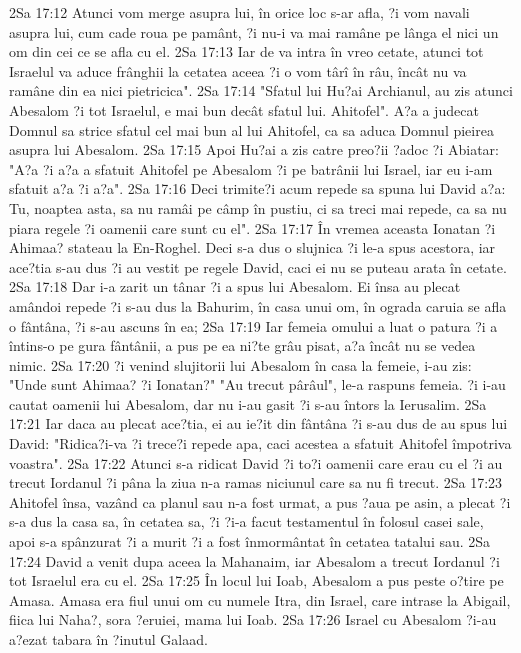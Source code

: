 2Sa 17:12  Atunci vom merge asupra lui, în orice loc s-ar afla, ?i vom navali asupra lui, cum cade roua pe pamânt, ?i nu-i va mai ramâne pe lânga el nici un om din cei ce se afla cu el.
2Sa 17:13  Iar de va intra în vreo cetate, atunci tot Israelul va aduce frânghii la cetatea aceea ?i o vom târî în râu, încât nu va ramâne din ea nici pietricica".
2Sa 17:14  "Sfatul lui Hu?ai Archianul, au zis atunci Abesalom ?i tot Israelul, e mai bun decât sfatul lui. Ahitofel". A?a a judecat Domnul sa strice sfatul cel mai bun al lui Ahitofel, ca sa aduca Domnul pieirea asupra lui Abesalom.
2Sa 17:15  Apoi Hu?ai a zis catre preo?ii ?adoc ?i Abiatar: "A?a ?i a?a a sfatuit Ahitofel pe Abesalom ?i pe batrânii lui Israel, iar eu i-am sfatuit a?a ?i a?a".
2Sa 17:16  Deci trimite?i acum repede sa spuna lui David a?a: Tu, noaptea asta, sa nu ramâi pe câmp în pustiu, ci sa treci mai repede, ca sa nu piara regele ?i oamenii care sunt cu el".
2Sa 17:17  În vremea aceasta Ionatan ?i Ahimaa? stateau la En-Roghel. Deci s-a dus o slujnica ?i le-a spus acestora, iar ace?tia s-au dus ?i au vestit pe regele David, caci ei nu se puteau arata în cetate.
2Sa 17:18  Dar i-a zarit un tânar ?i a spus lui Abesalom. Ei însa au plecat amândoi repede ?i s-au dus la Bahurim, în casa unui om, în ograda caruia se afla o fântâna, ?i s-au ascuns în ea;
2Sa 17:19  Iar femeia omului a luat o patura ?i a întins-o pe gura fântânii, a pus pe ea ni?te grâu pisat, a?a încât nu se vedea nimic.
2Sa 17:20  ?i venind slujitorii lui Abesalom în casa la femeie, i-au zis: "Unde sunt Ahimaa? ?i Ionatan?" "Au trecut pârâul", le-a raspuns femeia. ?i i-au cautat oamenii lui Abesalom, dar nu i-au gasit ?i s-au întors la Ierusalim.
2Sa 17:21  Iar daca au plecat ace?tia, ei au ie?it din fântâna ?i s-au dus de au spus lui David: "Ridica?i-va ?i trece?i repede apa, caci acestea a sfatuit Ahitofel împotriva voastra".
2Sa 17:22  Atunci s-a ridicat David ?i to?i oamenii care erau cu el ?i au trecut Iordanul ?i pâna la ziua n-a ramas niciunul care sa nu fi trecut.
2Sa 17:23  Ahitofel însa, vazând ca planul sau n-a fost urmat, a pus ?aua pe asin, a plecat ?i s-a dus la casa sa, în cetatea sa, ?i ?i-a facut testamentul în folosul casei sale, apoi s-a spânzurat ?i a murit ?i a fost înmormântat în cetatea tatalui sau.
2Sa 17:24  David a venit dupa aceea la Mahanaim, iar Abesalom a trecut Iordanul ?i tot Israelul era cu el.
2Sa 17:25  În locul lui Ioab, Abesalom a pus peste o?tire pe Amasa. Amasa era fiul unui om cu numele Itra, din Israel, care intrase la Abigail, fiica lui Naha?, sora ?eruiei, mama lui Ioab.
2Sa 17:26  Israel cu Abesalom ?i-au a?ezat tabara în ?inutul Galaad.
